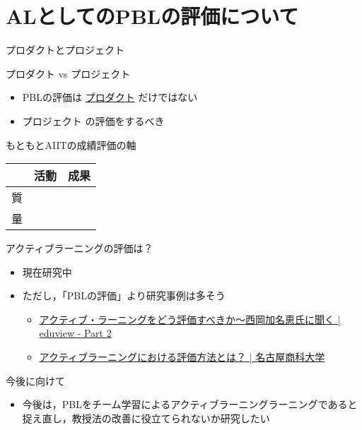 \documentclass[uplatex,dvipdfmx,14pt,presentation,t]{beamer}
\begin{document}
\section{ALとしてのPBLの評価について}
\label{sec-3}
\begin{frame}[label=sec-3-1]{プロダクトとプロジェクト}
\begin{block}{プロダクト vs プロジェクト}
\begin{itemize}
\item PBLの評価は \uline{プロダクト} だけではない
\item \alert{プロジェクト} の評価をするべき
\end{itemize}
\pause
\end{block}
\begin{block}{もともとAIITの成績評価の軸}
\begin{center}
\begin{tabular}{lll}
 & 活動 & 成果\\
\hline
質 &  & \\
量 &  & \\
\end{tabular}
\end{center}
\end{block}
\end{frame}
\begin{frame}[label=sec-3-2]{アクティブラーニングの評価は？}
\begin{itemize}
\item 現在研究中
\item ただし，「PBLの評価」より研究事例は多そう
\begin{itemize}
\item \href{http://eduview.jp/?p=1636&page=2}{アクティブ・ラーニングをどう評価すべきか〜西岡加名恵氏に聞く | eduview - Part 2}
\item \href{http://www.nucba.ac.jp/active-learning/entry-15216.html}{アクティブラーニングにおける評価方法とは？ | 名古屋商科大学}
\end{itemize}
\end{itemize}
\end{frame}

\begin{frame}[label=sec-3-3]{今後に向けて}
\begin{itemize}
\item 今後は，PBLをチーム学習によるアクティブラーニングラーニングであると捉え直し，教授法の改善に役立てられないか研究したい
\end{itemize}
\end{frame}
\end{document}
